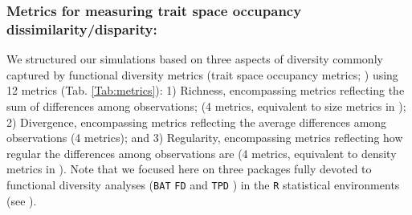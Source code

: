 \documentclass[12pt,letterpaper]{article}
\begin{document}
\subsubsection{Metrics for measuring trait space occupancy dissimilarity/disparity:}

We structured our simulations based on three aspects of diversity commonly captured by functional diversity metrics (trait space occupancy metrics; \cite{mammola2021concepts}) using 12 metrics (Tab. \ref{Tab:metrics}):
1) Richness, encompassing metrics reflecting the sum of differences among observations; (4 metrics, equivalent to size metrics in \citealt{guillerme2020shifting});
2) Divergence, encompassing metrics reflecting the average differences among observations (4 metrics); and
3) Regularity, encompassing metrics reflecting how regular the differences among observations are (4 metrics, equivalent to density metrics in \citealt{guillerme2020shifting}).
Note that we focused here on three packages fully devoted to functional diversity analyses (\texttt{BAT} \citealt{cardoso2015bat} \texttt{FD} \citealt{Laliberte2010FD} and \texttt{TPD} \citealt{carmona2019trait}) in the \texttt{R} statistical environments (see \citealt{mammola2021concepts}).
\end{document}
